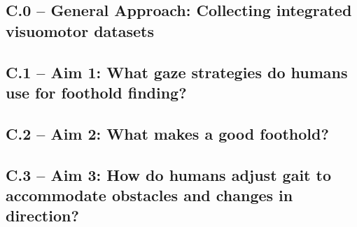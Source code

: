 


\subsection*{C.0 -- General Approach: Collecting integrated visuomotor datasets}







\subsection*{C.1 -- Aim 1: What gaze strategies do humans use for foothold finding?}



\subsection*{C.2 -- Aim 2: What makes a good foothold?}


\subsection*{C.3 -- Aim 3:  How do humans adjust gait to accommodate obstacles and changes in direction?}

